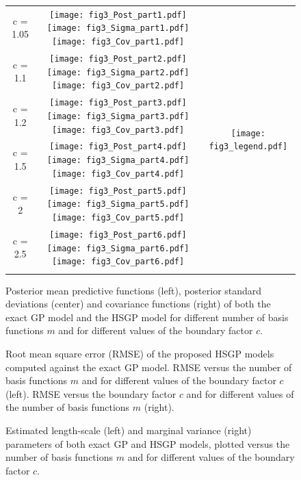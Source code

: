 \begin{figure}
\centering
\begin{tabular}{ c c c }
\arrayrulecolor{darkgray}\hline
c = 1.05 &
\texttt{[image: fig3\_Post\_part1.pdf]}
\texttt{[image: fig3\_Sigma\_part1.pdf]} 
\texttt{[image: fig3\_Cov\_part1.pdf]} & 
\multirow{43}{*}{ \texttt{[image: fig3\_legend.pdf]}}\\ 
\arrayrulecolor{lightgray}\cline{1-2}
c = 1.1 &
\texttt{[image: fig3\_Post\_part2.pdf]} 
\texttt{[image: fig3\_Sigma\_part2.pdf]} 
\texttt{[image: fig3\_Cov\_part2.pdf]} &\\
\cline{1-2}
c = 1.2 &
\texttt{[image: fig3\_Post\_part3.pdf]} 
\texttt{[image: fig3\_Sigma\_part3.pdf]} 
\texttt{[image: fig3\_Cov\_part3.pdf]} &\\
\cline{1-2}
c = 1.5 &
\texttt{[image: fig3\_Post\_part4.pdf]} 
\texttt{[image: fig3\_Sigma\_part4.pdf]} 
\texttt{[image: fig3\_Cov\_part4.pdf]} & \\
\cline{1-2}
c = 2 &
\texttt{[image: fig3\_Post\_part5.pdf]} 
\texttt{[image: fig3\_Sigma\_part5.pdf]} 
\texttt{[image: fig3\_Cov\_part5.pdf]} & \\
\cline{1-2}
c = 2.5 &
\texttt{[image: fig3\_Post\_part6.pdf]}
\texttt{[image: fig3\_Sigma\_part6.pdf]}
\texttt{[image: fig3\_Cov\_part6.pdf]} &\\
\arrayrulecolor{darkgray}\hline
\end{tabular}
\caption{Posterior mean predictive functions (left), posterior standard deviations (center) and  covariance functions (right) of both the exact GP model and the HSGP model for different number of basis functions $m$ and for different values of the boundary factor $c$.}
  \label{fig3_Post_part1}
\end{figure}

\begin{figure} %
\centering
{}
\caption{Root mean square error (RMSE) of the proposed HSGP models computed against the exact GP model. RMSE versus the number of basis functions $m$ and for different values of the boundary factor $c$ (left). RMSE versus the boundary factor $c$ and for different values of the number of basis functions $m$ (right). }
  \label{fig4_MSE_vs_J}
\end{figure}

\begin{figure} %
\centering
{}
\caption{Estimated length-scale (left) and marginal variance (right) parameters of both exact GP and HSGP models, plotted versus the number of basis functions $m$ and for different values of the boundary factor $c$.}
  \label{fig5_lscale_vs_J}
\end{figure}

